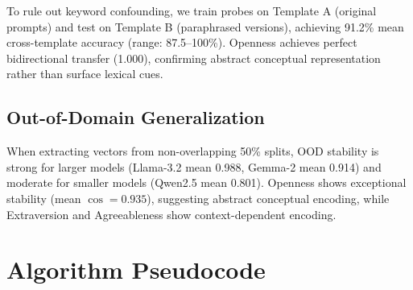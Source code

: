 \documentclass{article}
\begin{document}
To rule out keyword confounding, we train probes on Template A (original prompts) and test on Template B (paraphrased versions), achieving 91.2\% mean cross-template accuracy (range: 87.5--100\%). Openness achieves perfect bidirectional transfer (1.000), confirming abstract conceptual representation rather than surface lexical cues.

\subsection{Out-of-Domain Generalization}\label{app:ood}

When extracting vectors from non-overlapping 50\% splits, OOD stability is strong for larger models (Llama-3.2 mean 0.988, Gemma-2 mean 0.914) and moderate for smaller models (Qwen2.5 mean 0.801). Openness shows exceptional stability (mean $\cos=0.935$), suggesting abstract conceptual encoding, while Extraversion and Agreeableness show context-dependent encoding.

\section{Algorithm Pseudocode}\label{app:algorithm}
\end{document}

